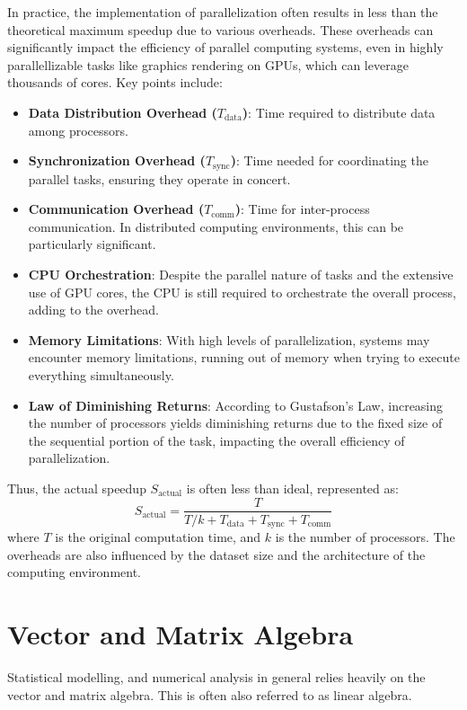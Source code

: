 \documentclass[12pt, twoside,hidelinks]{article}
\theoremstyle{definition}
\numberwithin{equation}{section}
\begin{document}
In practice, the implementation of parallelization often results in less than the theoretical maximum speedup due to various overheads. These overheads can significantly impact the efficiency of parallel computing systems, even in highly parallellizable tasks like graphics rendering on GPUs, which can leverage thousands of cores. Key points include:

\begin{itemize}
    \item \textbf{Data Distribution Overhead (\(T_{\text{data}}\))}: Time required to distribute data among processors.
    \item \textbf{Synchronization Overhead (\(T_{\text{sync}}\))}: Time needed for coordinating the parallel tasks, ensuring they operate in concert.
    \item \textbf{Communication Overhead (\(T_{\text{comm}}\))}: Time for inter-process communication. In distributed computing environments, this can be particularly significant.
    \item \textbf{CPU Orchestration}: Despite the parallel nature of tasks and the extensive use of GPU cores, the CPU is still required to orchestrate the overall process, adding to the overhead.
    \item \textbf{Memory Limitations}: With high levels of parallelization, systems may encounter memory limitations, running out of memory when trying to execute everything simultaneously.
    \item \textbf{Law of Diminishing Returns}: According to Gustafson's Law, increasing the number of processors yields diminishing returns due to the fixed size of the sequential portion of the task, impacting the overall efficiency of parallelization.
\end{itemize}

Thus, the actual speedup \(S_{\text{actual}}\) is often less than ideal, represented as:
\[ S_{\text{actual}} = \frac{T}{T/k + T_{\text{data}} + T_{\text{sync}} + T_{\text{comm}}} \]
where \(T\) is the original computation time, and \(k\) is the number of processors. The overheads are also influenced by the dataset size and the architecture of the computing environment.



\section{Vector and Matrix Algebra}

Statistical modelling, and numerical analysis in general relies heavily on the vector and matrix algebra. This is often also referred to as linear algebra.
\end{document}
